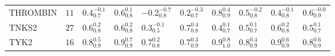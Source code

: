 \begin{tabular}{llllllllll}
THROMBIN    &   $11$ &   $0.4^{-0.1}_{0.7}$ &   $0.6^{0.1}_{0.8}$ &  $-0.2^{-0.7}_{0.8}$ &  $0.2^{-0.3}_{0.7}$ &   $0.8^{0.4}_{0.9}$ &  $0.5^{-0.2}_{0.8}$ &    $0.4^{-0.1}_{0.8}$ &  $0.6^{-0.0}_{0.9}$ \\
TNKS2       &   $27$ &    $0.6^{0.2}_{0.8}$ &   $0.6^{0.2}_{0.8}$ &   $0.3^{-0.1}_{0.5}$ &   $0.7^{0.4}_{0.8}$ &   $0.4^{0.1}_{0.7}$ &   $0.5^{0.1}_{0.7}$ &     $0.6^{0.2}_{0.8}$ &   $0.5^{0.1}_{0.7}$ \\
TYK2        &   $16$ &    $0.8^{0.5}_{0.9}$ &   $0.9^{0.7}_{0.9}$ &    $0.7^{0.2}_{0.8}$ &   $0.7^{0.3}_{0.9}$ &   $0.9^{0.8}_{1.0}$ &   $0.8^{0.4}_{0.9}$ &     $0.9^{0.6}_{0.9}$ &   $0.8^{0.6}_{0.9}$ \\
\bottomrule
\end{tabular}
